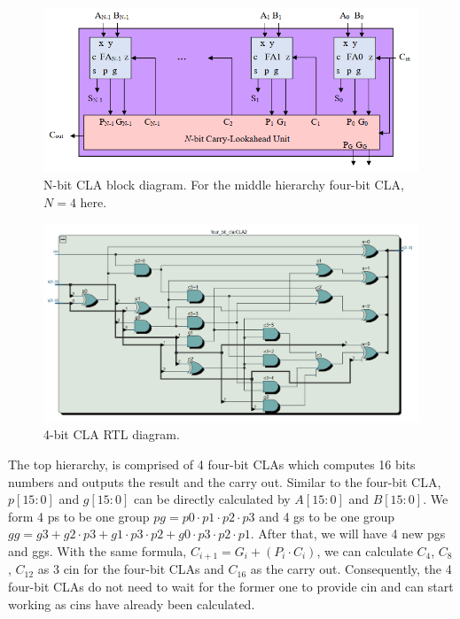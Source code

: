\documentclass[12pt]{article}
\begin{document}
\begin{figure}[H]
    \centering
    \includegraphics[width=15cm]{N_bit_CLA.png}
    \caption{N-bit CLA block diagram. For the middle hierarchy four-bit CLA, $N=4$ here. \cite{GG4.4}}
\end{figure}

\begin{figure}[H]
    \centering
    \includegraphics[width=15cm]{CLA_4bit.png}
    \caption{4-bit CLA RTL diagram.}
\end{figure}

The top hierarchy, is comprised of 4 four-bit CLAs which computes 16 bits numbers and outputs the result and the carry out. Similar to the four-bit CLA, $p[15:0]$ and $g[15:0]$ can be directly calculated by $A[15:0]$ and $B[15:0]$. We form 4 ps to be one group $pg=p0 \cdot p1 \cdot p2 \cdot p3$ and 4 gs to be one group $gg=g3+g2 \cdot p3+g1 \cdot p3 \cdot p2+g0 \cdot p3 \cdot p2 \cdot p1$. After that, we will have 4 new pgs and ggs. With the same formula, $C_{i+1}=G_i+(P_i \cdot C_i)$, we can calculate $C_4$, $C_8$, $C_{12}$ as 3 cin for the four-bit CLAs and $C_{16}$ as the carry out. Consequently, the 4 four-bit CLAs do not need to wait for the former one to provide cin and can start working as cins have already been calculated.
\end{document}
